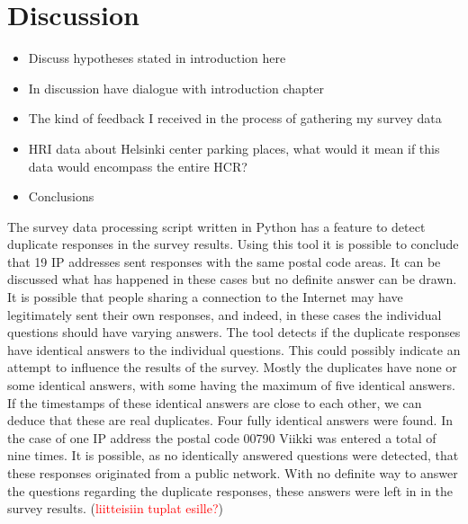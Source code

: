 \section{Discussion}
\justify

\begin{itemize}
  \item Discuss hypotheses stated in introduction here
  \item In discussion have dialogue with introduction chapter
  \item The kind of feedback I received in the process of gathering my survey data
  \item HRI data about Helsinki center parking places, what would it mean if this data would encompass the entire HCR?
  \item Conclusions
\end{itemize}

The survey data processing script written in Python has a feature to detect duplicate responses in the survey results. Using this tool it is possible to conclude that 19 IP addresses sent responses with the same postal code areas. It can be discussed what has happened in these cases but no definite answer can be drawn. It is possible that people sharing a connection to the Internet may have legitimately sent their own responses, and indeed, in these cases the individual questions should have varying answers. The tool detects if the duplicate responses have identical answers to the individual questions. This could possibly indicate an attempt to influence the results of the survey. Mostly the duplicates have none or some identical answers, with some having the maximum of five identical answers. If the timestamps of these identical answers are close to each other, we can deduce that these are real duplicates. Four fully identical answers were found. In the case of one IP address the postal code 00790 Viikki was entered a total of nine times. It is possible, as no identically answered questions were detected, that these responses originated from a public network. With no definite way to answer the questions regarding the duplicate responses, these answers were left in in the survey results. (\textcolor{red}{liitteisiin tuplat esille?})
